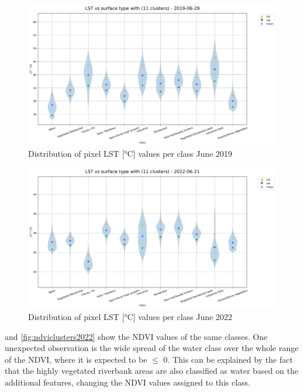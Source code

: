 \documentclass[12pt,a4paper, english,twoside]{scrartcl}
\begin{document}
       \begin{landscape}
         \begin{figure}[!p]
           \centering
           \includegraphics[width=0.91\linewidth]{img/LST vs surface type with (11 clusters) - 2019-06-29.png}
           \caption{Distribution of pixel \gls{LST} [°C] values per class June 2019 \label{fig:lstclusters19}}
         \end{figure}

         \begin{figure}[!p]
           \centering
           \includegraphics[width=0.91\linewidth]{img/LST vs surface type with (11 clusters) - 2022-06-21.png}
           \caption{Distribution of pixel \gls{LST} [°C] values per class June 2022 \label{fig:lstclusters22}}
         \end{figure}
       \end{landscape}
       \noindent
        and \cref{fig:ndviclusters2022} show the \gls{NDVI} values of the same classes.
       One unexpected observation is the wide spread of the water class over the whole range of the \gls{NDVI}, where it is expected to be $\le$ 0. 
       This can be explained by the fact that the highly vegetated riverbank areas are also classified as water based on the additional features, changing the \gls{NDVI} values assigned to this class.
\end{document}
